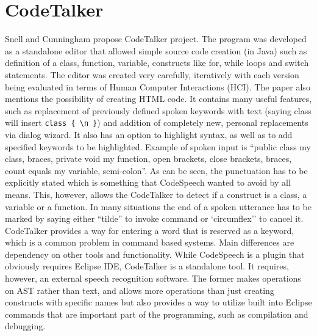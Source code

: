 \section{CodeTalker}
Snell and Cunningham propose CodeTalker project\cite{Snell2000}. The program was developed as a standalone editor that allowed simple source code creation (in Java) such as definition of a class, function, variable, constructs like for, while loops and switch statements. The editor was created very carefully, iteratively with each version being evaluated in terms of Human Computer Interactions (HCI). The paper also mentions the possibility of creating HTML code.
It contains many useful features, such as replacement of previously defined spoken keywords with text (\eg saying class will insert \texttt{class \{ 
\textbackslash n \}}) and addition of completely new, personal replacements via dialog wizard. It also has an option to highlight syntax, as well as to add specified keywords to be highlighted. Example of spoken input is ``public class my class, braces, private void my function, open brackets, close brackets, braces, count equals my variable, semi-colon''. As can be seen, the punctuation has to be explicitly stated which is something that CodeSpeech wanted to avoid by all means. This, however, allows the CodeTalker to detect if a construct is a class, a variable or a function. In many situations the end of a spoken utterance has to be marked by saying either ``tilde'' to invoke command or `circumflex'' to cancel it. CodeTalker provides a way for entering a word that is reserved as a keyword, which is a common problem in command based systems. Main differences are dependency on other tools and functionality. While CodeSpeech is a plugin that obviously requires Eclipse IDE, CodeTalker is a standalone tool. It requires, however, an external speech recognition software. The former makes operations on AST rather than text, and allows more operations than just creating constructs with specific names but also provides a way to utilize built into Eclipse commands that are important part of the programming, such as compilation and debugging.

